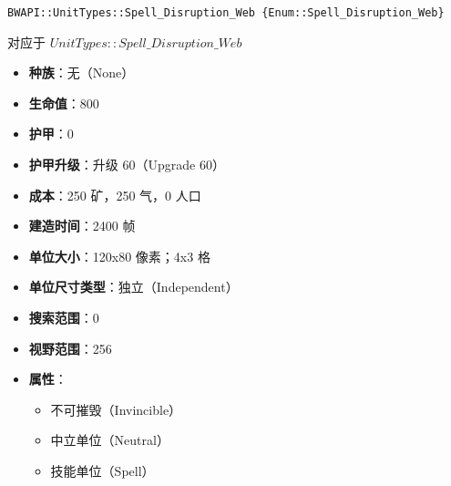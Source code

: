 \begin{tcolorbox}[colback=white, colframe=black!60!white, title=Spell\_Disruption\_Web(), arc=0mm]
    \begin{verbatim}
BWAPI::UnitTypes::Spell_Disruption_Web {Enum::Spell_Disruption_Web}
    \end{verbatim}
    对应于  $UnitTypes::Spell\_Disruption\_Web$ 
    \begin{itemize}
        \item \textbf{种族}：无（None）
        \item \textbf{生命值}：800
        \item \textbf{护甲}：0
        \item \textbf{护甲升级}：升级 60（Upgrade 60）
        \item \textbf{成本}：250 矿，250 气，0 人口
        \item \textbf{建造时间}：2400 帧
        \item \textbf{单位大小}：120x80 像素；4x3 格
        \item \textbf{单位尺寸类型}：独立（Independent）
        \item \textbf{搜索范围}：0
        \item \textbf{视野范围}：256
        \item \textbf{属性}：
            \begin{itemize}
                \item 不可摧毁（Invincible）
                \item 中立单位（Neutral）
                \item 技能单位（Spell）
            \end{itemize}
    \end{itemize}
\end{tcolorbox}

